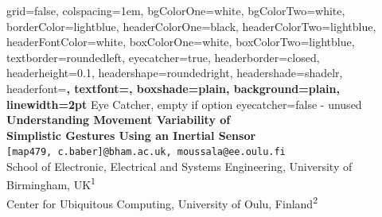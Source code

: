 \documentclass[a0paper,portrait]{baposter}
\begin{document}
\begin{poster}%
  {
  grid=false,
  colspacing=1em,
  bgColorOne=white,
  bgColorTwo=white,
  borderColor=lightblue,
  headerColorOne=black,
  headerColorTwo=lightblue,
  headerFontColor=white,
  boxColorOne=white,
  boxColorTwo=lightblue,
  textborder=roundedleft,
  eyecatcher=true,
  headerborder=closed,
  headerheight=0.1\textheight,
  headershape=roundedright,
  headershade=shadelr,
  headerfont=\Large\bf\textsc, %
  textfont={\setlength{\parindent}{1.5em}},
  boxshade=plain,
  background=plain,
  linewidth=2pt
  }
{
	Eye Catcher, empty if option eyecatcher=false - unused
}
{\bf
  {Understanding Movement Variability of \\ Simplistic Gestures Using an Inertial Sensor}
}
{
	\vspace{-0.3em} 
	{ } \\ \vspace{-0.5em}
	{\smaller \texttt{[map479, c.baber]@bham.ac.uk, moussala@ee.oulu.fi}} \\ \vspace{-0.2em}
	{\smaller
	School of Electronic, Electrical and Systems Engineering, University of Birmingham, UK\textsuperscript{1} \\
	Center for Ubiquitous Computing, University of Oulu, Finland\textsuperscript{2} }
}
  {%
  	}
\end{poster}
\end{document}
